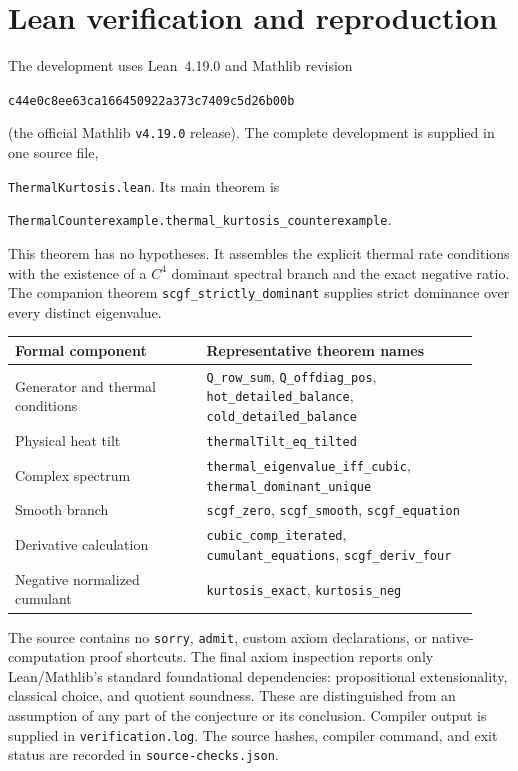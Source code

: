 \documentclass[11pt,a4paper]{article}
\begin{document}
\section{Lean verification and reproduction}\label{sec:lean}
The development uses Lean~4.19.0 and Mathlib revision
\begin{center}
\texttt{c44e0c8ee63ca166450922a373c7409c5d26b00b}
\end{center}
(the official Mathlib \texttt{v4.19.0} release). The complete development is supplied in one source file,\par
\texttt{ThermalKurtosis.lean}. Its main theorem is
\begin{center}
\texttt{ThermalCounterexample.thermal\_kurtosis\_counterexample}.
\end{center}
This theorem has no hypotheses. It assembles the explicit thermal rate conditions with the existence of a $C^4$ dominant spectral branch and the exact negative ratio. The companion theorem \texttt{scgf\_strictly\_dominant} supplies strict dominance over every distinct eigenvalue.

\begin{center}
\begin{tabular}{>{\raggedright\arraybackslash}p{0.38\linewidth}>{\raggedright\arraybackslash}p{0.54\linewidth}}
\toprule
Formal component & Representative theorem names\\
\midrule
Generator and thermal conditions & \texttt{Q\_row\_sum}, \texttt{Q\_offdiag\_pos}, \texttt{hot\_detailed\_balance}, \texttt{cold\_detailed\_balance}\\
Physical heat tilt & \texttt{thermalTilt\_eq\_tilted}\\
Complex spectrum & \texttt{thermal\_eigenvalue\_iff\_cubic}, \texttt{thermal\_dominant\_unique}\\
Smooth branch & \texttt{scgf\_zero}, \texttt{scgf\_smooth}, \texttt{scgf\_equation}\\
Derivative calculation & \texttt{cubic\_comp\_iterated}, \texttt{cumulant\_equations}, \texttt{scgf\_deriv\_four}\\
Negative normalized cumulant & \texttt{kurtosis\_exact}, \texttt{kurtosis\_neg}\\
\bottomrule
\end{tabular}
\end{center}
The source contains no \texttt{sorry}, \texttt{admit}, custom axiom declarations, or native-computation proof shortcuts. The final axiom inspection reports only Lean/Mathlib's standard foundational dependencies: propositional extensionality, classical choice, and quotient soundness. These are distinguished from an assumption of any part of the conjecture or its conclusion. Compiler output is supplied in \texttt{verification.log}. The source hashes, compiler command, and exit status are recorded in \texttt{source-checks.json}.
\end{document}

